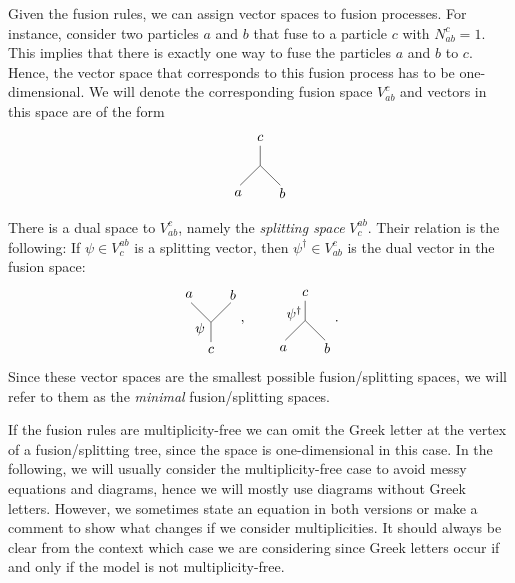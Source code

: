 Given the fusion rules, we can assign vector spaces to fusion processes. For instance, consider two particles $a$ and $b$ that fuse to a particle $c$ with $N_{ab}^c=1$. This implies that there is exactly one way to fuse the particles $a$ and $b$ to $c$. Hence, the vector space that corresponds to this fusion process has to be one-dimensional. We will denote the corresponding fusion space $V_{ab}^c$ and vectors in this space are of the form
	\begin{equation}
		\begin{tikzpicture}[scale=0.5,baseline=(current bounding box.center)]
			\draw (0,0) -- (0,-1);
			\draw (0,-1) -- (-1,-2);
			\draw (0,-1) -- (1,-2);
			\node at (0,0.4) {$c$};
			\node at (-1.1,-2.4) {$a$};
			\node at (1.1,-2.4) {$b$};
		\end{tikzpicture}
	\end{equation}

There is a dual space to $V_{ab}^c$, namely the \emph{splitting space} $V_c^{ab}$. Their relation is the following: If $\psi\in V_c^{ab}$ is a splitting vector, then $\psi^\dagger\in V_{ab}^c$ is the dual vector in the fusion space:
	\begin{equation}
		\begin{tikzpicture}[scale=0.5,baseline=(current bounding box.center),yscale=-1]
		\node at (-0.55,-0.65) {$\psi$};
		\draw (0,0) -- (0,-1);
		\draw (0,-1) -- (-1,-2);
		\draw (0,-1) -- (1,-2);
		\node at (0,0.4) {$c$};
		\node at (-1.1,-2.4) {$a$};
		\node at (1.1,-2.4) {$b$};
		\end{tikzpicture},\hspace{20pt}\begin{tikzpicture}[scale=0.5,baseline=(current bounding box.center)]
		\node at (-0.55,-0.65) {$\psi^\dagger$};
		\draw (0,0) -- (0,-1);
		\draw (0,-1) -- (-1,-2);
		\draw (0,-1) -- (1,-2);
		\node at (0,0.4) {$c$};
		\node at (-1.1,-2.4) {$a$};
		\node at (1.1,-2.4) {$b$};
		\end{tikzpicture}.
	\end{equation}
Since these vector spaces are the smallest possible fusion/splitting spaces, we will refer to them as the \emph{minimal} fusion/splitting spaces.

\begin{rem}
	If the fusion rules are multiplicity-free we can omit the Greek letter at the vertex of a fusion/splitting tree, since the space is one-dimensional in this case. In the following, we will usually consider the multiplicity-free case to avoid messy equations and diagrams, hence we will mostly use diagrams without Greek letters. However, we sometimes state an equation in both versions or make a comment to show what changes if we consider multiplicities. It should always be clear from the context which case we are considering since Greek letters occur if and only if the model is not multiplicity-free.
\end{rem}

